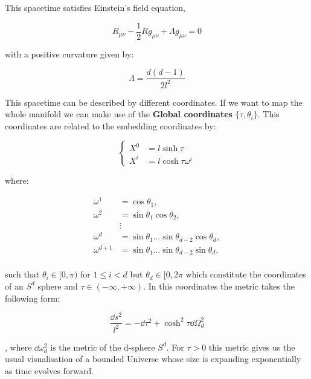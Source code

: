 \documentclass[11pt,a4paper]{article}
\begin{document}
This spacetime satisfies Einstein's field equation,

\begin{equation}
    R_{\mu\nu} - \frac{1}{2}R g_{\mu\nu} + \Lambda g_{\mu\nu} = 0
\end{equation}

{\noindent with a positive curvature given by:}

\begin{equation}
    \Lambda = \frac{d(d-1)}{2l^2}
\end{equation}

This spacetime can be described by different coordinates. If we want to map the whole manifold we can make use of the \textbf{Global coordinates} $\{\tau,\theta_i\}$. This coordinates are related to the embedding coordinates by:

\begin{equation}
    \left\{
        \begin{aligned}
            X^0 &= l\sinh\tau\\
            X^i &= l\cosh\tau \omega^i
        \end{aligned}
    \right.
\end{equation}

{\noindent where:}

\begin{equation}
    \begin{aligned}
        \omega^1 &= \cos\theta_1,\\
        \omega^2 &= \sin\theta_1\cos\theta_2,\\
                 &\vdots\\
        \omega^d &= \sin\theta_1...\sin\theta_{d-2}\cos\theta_{d},\\
        \omega^{d+1} &= \sin\theta_1...\sin\theta_{d-2}\sin\theta_{d},\\
    \end{aligned}
\end{equation}

{\noindent such that $\theta_i\in[0,\pi)$ for $1\leq i < d$ but $\theta_d\in[0,2\pi$ which constitute the coordinates of an $S^d$ sphere and $\tau\in(-\infty,+\infty)$. In this coordinates the metric takes the following form:}

\begin{equation}
    \frac{\dd s^2}{l^2} = -\dd\tau^2 + \cosh^2\tau \dd\Omega_d^2
\end{equation}

{\noindent, where $\dd \omega_d^2$ is the metric of the d-sphere $S^d$. For $\tau>0$ this metric gives us the usual visualisation of a bounded Universe whose size is expanding exponentially as time evolves forward.}
\end{document}
